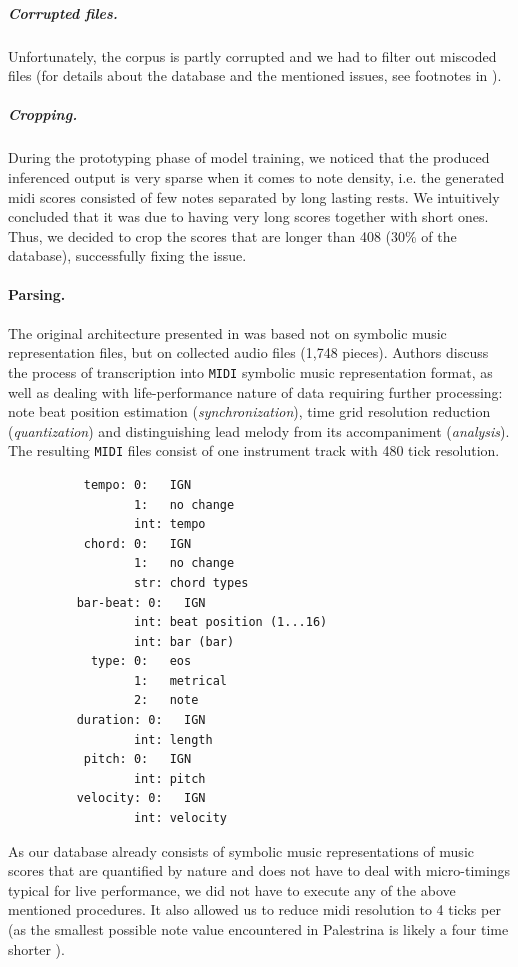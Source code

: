 \documentclass{article}
\begin{document}
\begin{multicols}{2}
        \subparagraph{Corrupted files.} Unfortunately, the corpus is partly corrupted and we had to filter out miscoded files (for details about the database and the mentioned issues, see footnotes in \cite[p. 6]{arthur_vicentino_2021}).

        \subparagraph{Cropping.} During the prototyping phase of model training, we noticed that the produced inferenced output is very sparse when it comes to note density, i.e. the generated midi scores consisted of few notes separated by long lasting rests. We intuitively concluded that it was due to having very long scores together with short ones. Thus, we decided to crop the scores that are longer than 408 \crotchet{} (30\% of the database), successfully fixing the issue.

        \paragraph{Parsing.}
        The original architecture presented in \cite{hsiao_compound_2021} was based not on symbolic music representation files, but on collected audio files (1,748 pieces). Authors discuss the process of transcription into \texttt{MIDI} symbolic music representation format, as well as dealing with life-performance nature of data requiring further processing: note beat position estimation (\emph{synchronization}), time grid resolution reduction (\emph{quantization}) and distinguishing lead melody from its accompaniment (\emph{analysis}). The resulting \texttt{MIDI} files consist of one instrument track with 480 tick resolution. 

        \begin{figure}[H]
            \begin{verbatim}
     tempo: 0:   IGN     
            1:   no change
            int: tempo
     chord: 0:   IGN
            1:   no change
            str: chord types
    bar-beat: 0:   IGN     
            int: beat position (1...16)
            int: bar (bar)
      type: 0:   eos    
            1:   metrical
            2:   note
    duration: 0:   IGN
            int: length
     pitch: 0:   IGN
            int: pitch
    velocity: 0:   IGN    
            int: velocity
            \end{verbatim}
        \end{figure}

        As our database already consists of symbolic music representations of music scores that are quantified by nature and does not have to deal with micro-timings typical for live performance, we did not have to execute any of the above mentioned procedures. It also allowed us to reduce midi resolution to 4 ticks per \crotchet{} (as the smallest possible note value encountered in Palestrina is likely a four time shorter \semiquaver).


\end{multicols}
\end{document}

